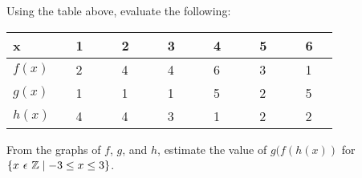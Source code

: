\documentclass[11pt,addpoints]{exam}
\begin{document}
\begin{questions}
	\question Using the table above, evaluate the following: %
	\begin{table}[]
		\begin{tabular}{|l|l|l|l|l|l|l|}
			\hline
			x$\quad$$\quad$ & $\quad$1$\quad$ & $\quad$2$\quad$ & $\quad$3$\quad$ & $\quad$4$\quad$ & $\quad$5$\quad$ & $\quad$6$\quad$ \\ \hline
			$f(x)$          & $\quad$2$\quad$ & $\quad$4$\quad$ & $\quad$4$\quad$ & $\quad$6$\quad$ & $\quad$3$\quad$ & $\quad$1$\quad$ \\ \hline
			$g(x)$          & $\quad$1$\quad$ & $\quad$1$\quad$ & $\quad$1$\quad$ & $\quad$5$\quad$ & $\quad$2$\quad$ & $\quad$5$\quad$ \\ \hline
			$h(x)$          & $\quad$4$\quad$ & $\quad$4$\quad$ & $\quad$3$\quad$ & $\quad$1$\quad$ & $\quad$2$\quad$ & $\quad$2$\quad$ \\ \hline
		\end{tabular}
	\end{table}
	\begin{multicols}{2}
	\end{multicols}

	\question From the graphs of $f$, $g$, and $h$, estimate the value of $g(f(h(x))$ for $\{x\hspace{0.125cm}\epsilon\hspace{0.125cm}\mathbb{Z} \mid -3\leq x\leq 3\}$. %
\end{questions}
\end{document}
